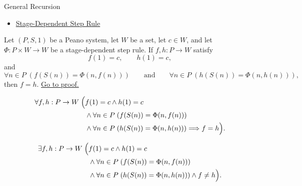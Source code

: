 \begin{topicbox}{General Recursion}
\begin{remark*}[Dependencies]
\begin{itemize}
  \item \hyperref[def:stage-dependent-step-rule]{Stage-Dependent Step Rule}
\end{itemize}
\end{remark*}

\begin{tcolorbox}[colback=lembox, colframe=lemborder, arc=2pt,
  left=6pt, right=6pt, top=4pt, bottom=4pt,
  title={\small\textbf{Lemma (Uniqueness of General Recursive Functions)}},
  fonttitle=\small\bfseries]
\begin{lemma}
\label{lem:uniqueness-of-general-recursive-functions}
Let $(P,S,1)$ be a Peano system, let $W$ be a set, let $c\in W$, and let
$\Phi:P\times W\to W$ be a stage-dependent step rule. If $f,h:P\to W$ satisfy
\[
f(1)=c,\qquad h(1)=c,
\]
and
\[
\forall n\in P\;(f(S(n))=\Phi(n,f(n)))
\qquad\text{and}\qquad
\forall n\in P\;(h(S(n))=\Phi(n,h(n))),
\]
then $f=h$.
\hyperref[prf:uniqueness-of-general-recursive-functions]{Go to proof.}
\end{lemma}
\end{tcolorbox}

\begin{remark*}
\[
\begin{aligned}
\forall f,h:P\to W\;\Bigl(&
f(1)=c\land h(1)=c\\
&\land \forall n\in P\;(f(S(n))=\Phi(n,f(n)))\\
&\land \forall n\in P\;(h(S(n))=\Phi(n,h(n)))
\Longrightarrow f=h\Bigr).
\end{aligned}
\]
\end{remark*}


\begin{remark*}
\[
\begin{aligned}
\exists f,h:P\to W\;\Bigl(&
f(1)=c\land h(1)=c\\
&\land \forall n\in P\;(f(S(n))=\Phi(n,f(n)))\\
&\land \forall n\in P\;(h(S(n))=\Phi(n,h(n)))
\land f\neq h\Bigr).
\end{aligned}
\]
\end{remark*}


\end{topicbox}
